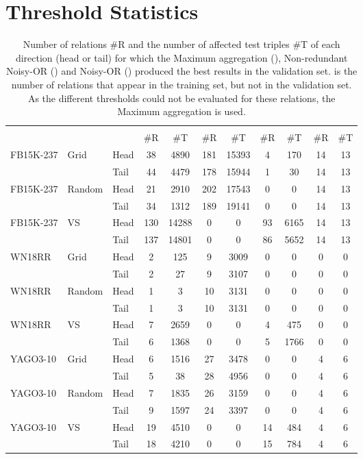 \documentclass[akbc,twoside,11pt,lettersize]{article}
\begin{document}
\section{Threshold Statistics}

\begin{table}[H]
    \centering
    \begin{tabular}{lllcccccccc}
    \hline
         & & & \multicolumn{2}{c}{} & \multicolumn{2}{c}{} & \multicolumn{2}{c}{}  & \multicolumn{2}{c}{}  \\
         & & & \#R & \#T & \#R & \#T & \#R & \#T & \#R & \#T \\ \hline
        FB15K-237 & Grid & Head & 38 & 4890 & 181 & 15393 & 4 & 170 & 14 & 13 \\
         & & Tail & 44 & 4479 & 178 & 15944 & 1 & 30 & 14 & 13 \\
        FB15K-237 & Random & Head & 21 & 2910 & 202 & 17543 & 0 & 0 & 14 & 13 \\
         & & Tail & 34 & 1312 & 189 & 19141 & 0 & 0 & 14 & 13 \\
        FB15K-237 & VS & Head & 130 & 14288 & 0 & 0 & 93 & 6165 & 14 & 13 \\
         & & Tail & 137 & 14801 & 0 & 0 & 86 & 5652 & 14 & 13 \\
        \hline
        WN18RR & Grid & Head & 2 & 125 & 9 & 3009 & 0 & 0 & 0 & 0 \\
         & & Tail & 2 & 27 & 9 & 3107 & 0 & 0 & 0 & 0 \\
        WN18RR & Random & Head & 1 & 3 & 10 & 3131 & 0 & 0 & 0 & 0 \\
         & & Tail & 1 & 3 & 10 & 3131 & 0 & 0 & 0 & 0 \\
        WN18RR & VS & Head & 7 & 2659 & 0 & 0 & 4 & 475 & 0 & 0 \\
         & & Tail & 6 & 1368 & 0 & 0 & 5 & 1766 & 0 & 0 \\
        \hline
        YAGO3-10 & Grid & Head & 6 & 1516 & 27 & 3478 & 0 & 0 & 4 & 6 \\
         & & Tail & 5 & 38 & 28 & 4956 & 0 & 0 & 4 & 6 \\
        YAGO3-10 & Random & Head & 7 & 1835 & 26 & 3159 & 0 & 0 & 4 & 6 \\
         & & Tail & 9 & 1597 & 24 & 3397 & 0 & 0 & 4 & 6 \\
        YAGO3-10 & VS & Head & 19 & 4510 & 0 & 0 & 14 & 484 & 4 & 6 \\
         & & Tail & 18 & 4210 & 0 & 0 & 15 & 784 & 4 & 6 \\
        \hline
    \end{tabular}
    \caption{ Number of relations \#R and the number of affected test triples \#T of each direction (head or tail) for which the Maximum aggregation (), Non-redundant Noisy-OR () and Noisy-OR () produced the best results in the validation set.  is the number of relations that appear in the training set, but not in the validation set. As the different thresholds could not be evaluated for these relations, the Maximum aggregation is used. }
    \label{distribution}
\end{table}
\end{document}
